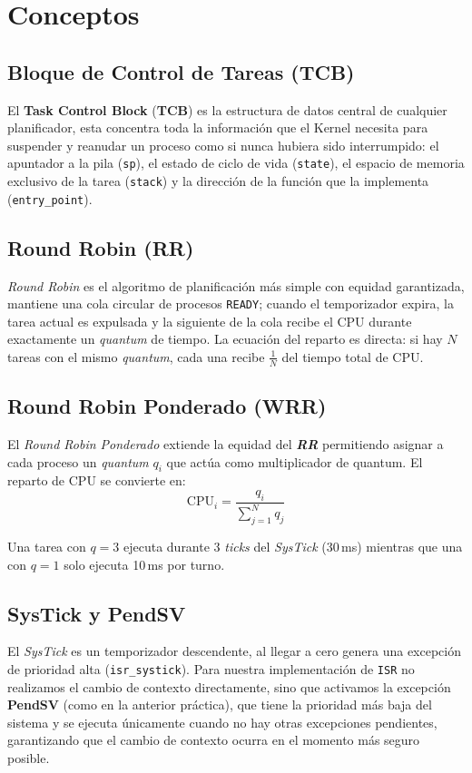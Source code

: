 \documentclass[12pt,letterpaper]{article}
\begin{document}
\newpage

\section*{Conceptos}

\subsection*{Bloque de Control de Tareas (TCB)}
El \textbf{Task Control Block} (\textbf{TCB}) es la estructura de datos central de cualquier planificador, esta concentra toda la información que el Kernel necesita para suspender y reanudar un proceso como si nunca hubiera sido interrumpido: el apuntador a la pila (\texttt{sp}), el estado de ciclo de vida (\texttt{state}), el espacio de
memoria exclusivo de la tarea (\texttt{stack}) y la dirección de la función que la implementa (\texttt{entry\_point}).
 
\subsection*{Round Robin (RR)}
\textit{Round Robin} es el algoritmo de planificación más simple con equidad garantizada, mantiene una cola circular de procesos \texttt{READY}; cuando el temporizador expira, la tarea actual es expulsada y la siguiente de la cola recibe el CPU durante exactamente un \textit{quantum} de tiempo. La ecuación del reparto es directa: si hay $N$ tareas con el mismo \textit{quantum}, cada una recibe $\frac{1}{N}$ del tiempo total de CPU.
 
\subsection*{Round Robin Ponderado (WRR)}
El \textit{Round Robin Ponderado} extiende la equidad del \textit{\textbf{RR}} permitiendo asignar a cada proceso un \textit{quantum} $q_i$ que actúa como multiplicador de quantum.  El reparto de CPU se convierte en:
\[
  \text{CPU}_{i} = \frac{q_i}{\displaystyle\sum_{j=1}^{N} q_j}
\]
 
Una tarea con $q = 3$ ejecuta durante 3 \textit{ticks} del \textit{SysTick} (30\,ms) mientras que una con $q = 1$ solo ejecuta 10\,ms por turno.
 
\subsection*{SysTick y PendSV}
El \textit{SysTick} es un temporizador descendente, al llegar a cero genera una excepción de prioridad alta (\texttt{isr\_systick}). Para nuestra implementación de \texttt{ISR} no realizamos el cambio de contexto directamente, sino que activamos la excepción \textbf{PendSV} (como en la anterior práctica), que tiene la prioridad más baja del sistema y se ejecuta únicamente cuando no hay otras excepciones pendientes, garantizando que el cambio de contexto ocurra en el momento más seguro posible.
 
\end{document}
